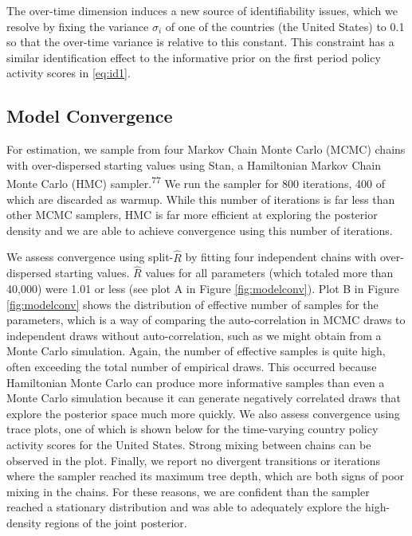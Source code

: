 \documentclass[
]{article}
\begin{document}
The over-time dimension induces a new source of identifiability issues, which we resolve by fixing the variance \(\sigma_i\) of one of the countries (the United States) to 0.1 so that the over-time variance is relative to this constant. This constraint has a similar identification effect to the informative prior on the first period policy activity scores in \eqref{eq:id1}.

\hypertarget{model-convergence}{%
\subsection*{Model Convergence}\label{model-convergence}}

For estimation, we sample from four Markov Chain Monte Carlo (MCMC) chains with over-dispersed starting values using Stan, a Hamiltonian Markov Chain Monte Carlo (HMC) sampler.\textsuperscript{77} We run the sampler for 800 iterations, 400 of which are discarded as warmup. While this number of iterations is far less than other MCMC samplers, HMC is far more efficient at exploring the posterior density and we are able to achieve convergence using this number of iterations.

We assess convergence using split-\(\hat{R}\) by fitting four independent chains with over-dispersed starting values. \(\hat{R}\) values for all parameters (which totaled more than 40,000) were 1.01 or less (see plot A in Figure \ref{fig:modelconv}). Plot B in Figure \ref{fig:modelconv} shows the distribution of effective number of samples for the parameters, which is a way of comparing the auto-correlation in MCMC draws to independent draws without auto-correlation, such as we might obtain from a Monte Carlo simulation. Again, the number of effective samples is quite high, often exceeding the total number of empirical draws. This occurred because Hamiltonian Monte Carlo can produce more informative samples than even a Monte Carlo simulation because it can generate negatively correlated draws that explore the posterior space much more quickly. We also assess convergence using trace plots, one of which is shown below for the time-varying country policy activity scores for the United States. Strong mixing between chains can be observed in the plot. Finally, we report no divergent transitions or iterations where the sampler reached its maximum tree depth, which are both signs of poor mixing in the chains. For these reasons, we are confident than the sampler reached a stationary distribution and was able to adequately explore the high-density regions of the joint posterior.
\end{document}

